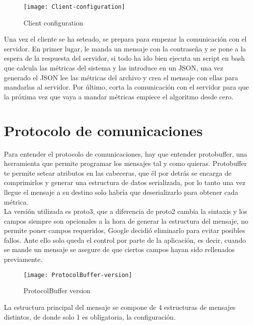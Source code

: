 \documentclass[ spanish, a4paper, 12pt, oneside]{report}
\begin{document}
\begin{figure}[!h]
   \centering
   \texttt{[image: Client-configuration]}\\
      \caption{\label{fig: Client configuration} Client configuration}
\end{figure}

Una vez el cliente se ha seteado, se prepara para empezar la comunicación con el servidor. En primer lugar, le manda un mensaje con la contraseña y se pone a la espera de la respuesta del servidor, si todo ha ido bien 
ejecuta un script en bash que calcula las métricas del sistema y las introduce en un JSON, una vez generado el JSON lee las métricas del archivo y crea el mensaje con ellas para mandarlas al servidor. Por último, corta la comunicación 
con el servidor para que la próxima vez que vaya a mandar métricas empiece el algoritmo desde cero. \\
\section{Protocolo de comunicaciones}

Para entender el protocolo de comunicaciones, hay que entender protobuffer, una herramienta que permite programar los mensajes tal y como quieras. Protobuffer te permite setear atributos en las cabeceras, que él por detrás se encarga de 
comprimirlos y generar una estructura de datos serializada, por lo tanto una vez llegue el mensaje a su destino solo habría que deserializarlo para obtener cada métrica. \\

La versión utilizada es proto3, que a diferencia de proto2 cambia la sintaxis y los campos siempre son opcionales a la hora de generar la estructura del mensaje, no permite poner campos requeridos, Google decidió eliminarlo para 
evitar posibles fallos. Ante ello solo queda el control por parte de la aplicación, es decir, cuando se mande un mensaje se asegure de que ciertos campos hayan sido rellenados previamente. \\


\begin{figure}[!h]
   \centering
   \texttt{[image: ProtocolBuffer-version]}\\
      \caption{\label{fig: ProtocolBuffer version} ProtocolBuffer version}
\end{figure}

La estructura principal del mensaje se compone de 4 estructuras de mensajes distintos, de donde solo 1 es obligatoria, la configuración. \\
\end{document}
